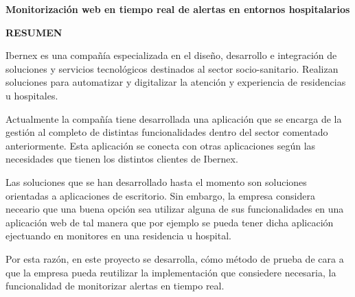\begin{center}
{\Large \bfseries Monitorización web en tiempo real de alertas en entornos hospitalarios}

\vspace{1cm}
{\Large \bfseries RESUMEN}

\end{center}


Ibernex es una compañía especializada en el diseño, desarrollo e integración de soluciones y servicios tecnológicos destinados al sector socio-sanitario.
Realizan soluciones para automatizar y digitalizar la atención y experiencia de residencias u hospitales. \newline

Actualmente la compañía tiene desarrollada una aplicación que se encarga de la gestión al completo de distintas funcionalidades dentro del sector comentado anteriormente. Esta aplicación se conecta con otras aplicaciones según las necesidades que tienen los distintos clientes de Ibernex. \newline

Las soluciones que se han desarrollado hasta el momento son soluciones orientadas a aplicaciones de escritorio. Sin embargo, la empresa considera neceario que una buena opción sea utilizar alguna de sus funcionalidades en una aplicación web de tal manera que por ejemplo se pueda tener dicha aplicación ejectuando en monitores en una residencia u hospital. \newline

Por esta razón, en este proyecto se desarrolla, cómo método de prueba de cara a que la empresa pueda reutilizar la implementación que consiedere necesaria, la funcionalidad de monitorizar alertas en tiempo real.

